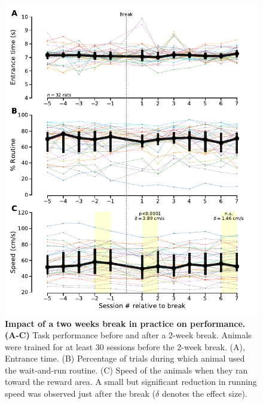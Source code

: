 \begin{figure}[h!]
  \begin{center}
    \includegraphics[width=1\linewidth]{Figures/BreakEffect.pdf}
    \caption
    {\textbf{Impact of a two weeks break in practice on performance.}
    \textbf{(A-C)} Task performance before and after a 2-week break. Animals were trained for at least 30 sessions before the 2-week break. (A), Entrance time. (B) Percentage of trials during which animal used the wait-and-run routine. (C) Speed of the animals when they ran toward the reward area. A small but significant reduction in running speed was observed just after the break ($\delta$ denotes the effect size).
    }
    \label{sfig3}
  \end{center}
\end{figure}